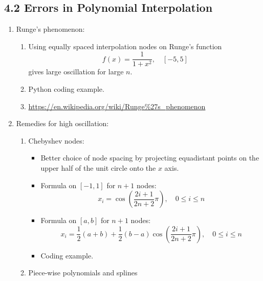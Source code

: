 \documentclass{article}
\theoremstyle{remark}
\begin{document}
\subsection{4.2 Errors in Polynomial Interpolation }

\begin{enumerate}
\item Runge's phenomenon: 
\begin{enumerate}
\item Using equally spaced interpolation nodes on Runge's function
\[
f(x) = \frac{1}{1+x^2}, \quad [-5,5]
\]
gives large oscillation for large $n$.
\item Python coding example.
\item \url{https://en.wikipedia.org/wiki/Runge%27s_phenomenon}
\end{enumerate}


\item Remedies for high oscillation:
\begin{enumerate}
\item Chebyshev nodes: 
\begin{itemize}
\item Better choice of node spacing by projecting equadistant points on the upper half of the unit circle onto the $x$ axis. 
\item Formula on $[-1,1]$ for $n+1$ nodes:
\[
x_i = \cos\left( \frac{2i+1}{2n+2}\pi \right), \quad 0 \leq i \leq n
\]
\item Formula on $[a,b]$ for $n+1$ nodes:
\[
x_i = \frac{1}{2}(a+b) + \frac{1}{2}(b-a) \cos\left( \frac{2i+1}{2n+2}\pi \right), \quad 0 \leq i \leq n
\]
\item Coding example.
\end{itemize}

\item Piece-wise polynomials and splines


\end{enumerate}


\end{enumerate}
\end{document}
